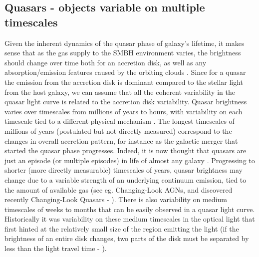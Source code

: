 \documentclass[modern]{aastex62}
\begin{document}
\subsection{Quasars - objects variable on multiple timescales }
Given the inherent dynamics of the quasar phase of galaxy's lifetime, it makes sense that as the gas supply to the SMBH environment varies, the brightness should change over time both for an accretion disk, as well as any absorption/emission features caused by the orbiting clouds \citep{stern2017, schawinski2015}.  Since for a quasar the emission from the accretion disk is dominant compared to the stellar light from the host galaxy, we can assume that all the coherent variability  in the quasar light curve is related to the accretion disk variability. Quasar brightness varies over timescales from millions of years to hours, with variability on each timescale tied to a different physical mechanism \citep{sartori2018}.  The longest timescales of millions of years (postulated but not directly measured) correspond to the changes in overall accretion pattern, for instance as the galactic merger that started the quasar phase progresses.  Indeed, it is now thought that quasars are just an episode (or multiple episodes) in life of almost any galaxy \citep{alexander2012, kormendy2013}. Progressing to shorter (more directly measurable) timescales of years, quasar brightness may change due to a variable strength of an underlying continuum emission, tied to the amount of available gas (see eg. Changing-Look AGNs, and discovered recently Changing-Look Quasars - \citealt{ruan2016, macleod2016, graham2017}). There is also variability on medium timescales of weeks to months that can be easily observed in a quasar light curve. Historically it was variability on these medium timescales  in the optical light that first hinted at the relatively small size of the region emitting the light (if the brightness of an entire disk changes, two parts of the disk must be separated by less than the light travel time -  \citealt{mudd2017, blackburne2011, morgan2010}). 
\end{document}
